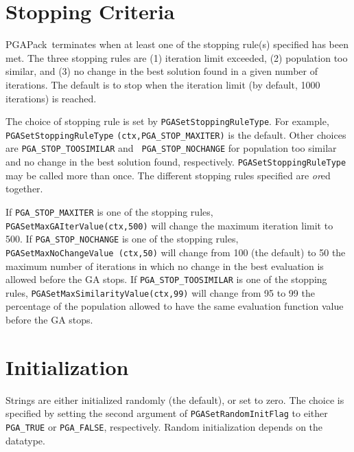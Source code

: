 \documentclass{report}
\newcommand{\pga}{PGAPack}
\begin{document}
\section{Stopping Criteria}\label{sec:stopping-criteria}

\pga\  terminates when at least one of the stopping
rule(s) specified has been met.  The three stopping rules are (1) iteration
limit exceeded, (2) population too similar, and (3) no change in the best
solution found in a given number of iterations.  The default is to stop when
the iteration limit (by default, 1000 iterations) is reached.

\begin{sloppypar}
The choice of stopping rule is set by {\tt PGASetStoppingRuleType}.  For
example, {\tt PGASetStoppingRuleType} {\tt (ctx,PGA\_STOP\_MAXITER)} is the
default.  Other choices are {\tt PGA\_STOP\_TOOSIMILAR} and {\tt
PGA\_STOP\_NOCHANGE} for population too similar and no change in the best
solution found, respectively.  {\tt PGASetStoppingRuleType} may be called more
than once. The different stopping rules specified are {\em or}ed together.
\end{sloppypar}

If {\tt PGA\_STOP\_MAXITER} is one of the stopping rules, {\tt
PGASetMaxGAIterValue(ctx,500)} will change the maximum iteration limit to 500.
If {\tt PGA\_STOP\_NOCHANGE} is one of the stopping rules, {\tt
PGASetMaxNoChangeValue (ctx,50)} will change from 100 (the default) to 50 the
maximum number of iterations in which no change in the best evaluation is
allowed before the GA stops.  If {\tt PGA\_STOP\_TOOSIMILAR} is one of the
stopping rules, {\tt PGASetMaxSimilarityValue(ctx,99)} will change from 95 to
99 the percentage of the population allowed to have the same evaluation
function value before the GA stops.


\section{Initialization}\label{sec:initialization}

Strings are either initialized randomly (the default),
or set to zero.  The choice is specified by setting the second argument of
{\tt PGASetRandomInitFlag} to either {\tt PGA\_TRUE} or {\tt PGA\_FALSE},
respectively.  Random initialization depends on the datatype.
\end{document}
